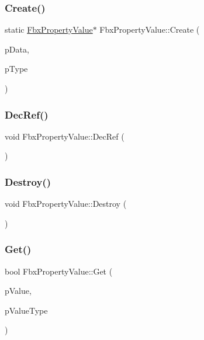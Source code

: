 \subsubsection{\texorpdfstring{Create()}{Create()}}
{\footnotesize\ttfamily static \hyperlink{class_fbx_property_value}{Fbx\+Property\+Value}$\ast$ Fbx\+Property\+Value\+::\+Create (\begin{DoxyParamCaption}\item[{void $\ast$}]{p\+Data,  }\item[{\hyperlink{fbxpropertytypes_8h_a73913a5ddfb20e57c6f25e9e6784bd92}{E\+Fbx\+Type}}]{p\+Type }\end{DoxyParamCaption})\hspace{0.3cm}{\ttfamily [static]}}

\mbox{\label{class_fbx_property_value_aacad1c8e1f83bf48b784ea1873442156}} 
\subsubsection{\texorpdfstring{Dec\+Ref()}{DecRef()}}
{\footnotesize\ttfamily void Fbx\+Property\+Value\+::\+Dec\+Ref (\begin{DoxyParamCaption}{ }\end{DoxyParamCaption})}

\mbox{\label{class_fbx_property_value_a017c539a6257ab1f1345e307861788a3}} 
\subsubsection{\texorpdfstring{Destroy()}{Destroy()}}
{\footnotesize\ttfamily void Fbx\+Property\+Value\+::\+Destroy (\begin{DoxyParamCaption}{ }\end{DoxyParamCaption})}

\mbox{\label{class_fbx_property_value_a3951cea8dd99842374a73df752825d76}} 
\subsubsection{\texorpdfstring{Get()}{Get()}}
{\footnotesize\ttfamily bool Fbx\+Property\+Value\+::\+Get (\begin{DoxyParamCaption}\item[{void $\ast$}]{p\+Value,  }\item[{\hyperlink{fbxpropertytypes_8h_a73913a5ddfb20e57c6f25e9e6784bd92}{E\+Fbx\+Type}}]{p\+Value\+Type }\end{DoxyParamCaption})}

